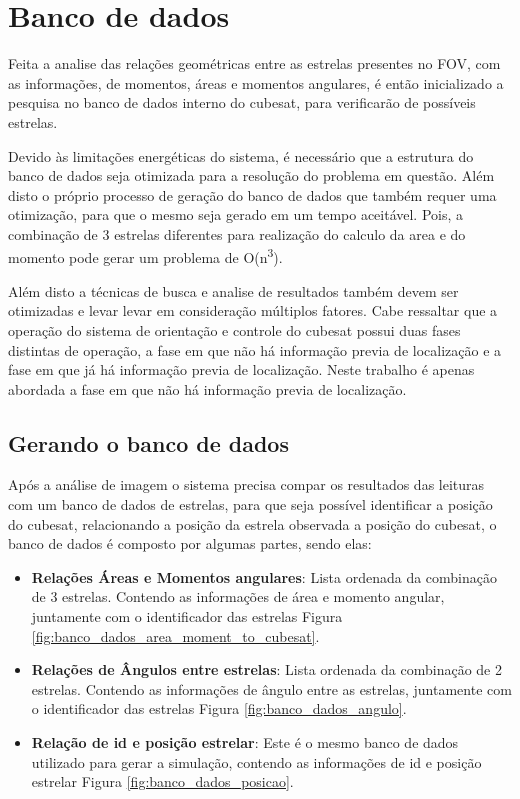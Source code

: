 \section{Banco de dados}

Feita a analise das relações geométricas entre as estrelas presentes no FOV, com as informações, de momentos, áreas e momentos angulares, 
é então inicializado a pesquisa no banco de dados interno do cubesat, para verificarão de possíveis estrelas.

Devido às limitações energéticas do sistema, é necessário que a estrutura do banco de dados seja otimizada para a resolução do problema em questão.
Além disto o próprio processo de geração do banco de dados que também requer uma otimização, para que o mesmo seja gerado em um tempo aceitável.
Pois, a combinação de 3 estrelas diferentes para realização do calculo da area e do momento pode gerar um problema de O(n\textsuperscript{3}).

Além disto a técnicas de busca e analise de resultados também devem ser otimizadas e levar levar em consideração múltiplos fatores.
Cabe ressaltar que a operação do sistema de orientação e controle do cubesat possui duas fases distintas de operação, a fase em que não há informação previa de localização e a fase em que já há informação previa de localização.
Neste trabalho é apenas abordada a fase em que não há informação previa de localização.

\subsection{Gerando o banco de dados}
Após a análise de imagem o sistema precisa compar os resultados das leituras com um banco de dados de estrelas, para que seja possível identificar a posição do cubesat, 
relacionando a posição da estrela observada a posição do cubesat, 
o banco de dados é composto por algumas partes, sendo elas:
\begin{itemize}
    \item \textbf{Relações Áreas e Momentos angulares}: Lista ordenada da combinação de 3 estrelas. Contendo as informações de área e momento angular, juntamente com o identificador das estrelas Figura \ref{fig:banco_dados_area_moment_to_cubesat}.
    \item \textbf{Relações de Ângulos entre estrelas}: Lista ordenada da combinação de 2 estrelas. Contendo as informações de ângulo entre as estrelas, juntamente com o identificador das estrelas Figura \ref{fig:banco_dados_angulo}.
    \item \textbf{Relação de id e posição estrelar}: Este é o mesmo banco de dados utilizado para gerar a simulação, contendo as informações de id e posição estrelar Figura \ref{fig:banco_dados_posicao}.
\end{itemize}

